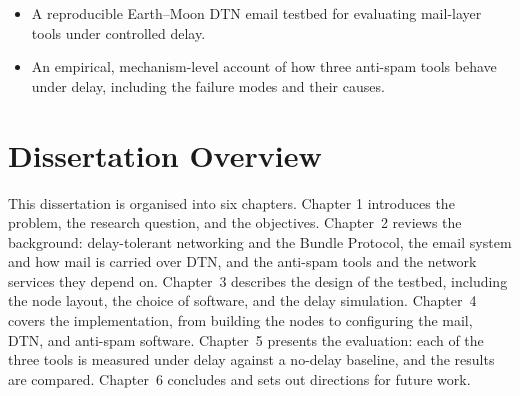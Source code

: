 \begin{itemize}
  \item A reproducible Earth--Moon DTN email testbed for evaluating mail-layer tools
  under controlled delay.
  \item An empirical, mechanism-level account of how three anti-spam tools behave
  under delay, including the failure modes and their causes.
\end{itemize}

\section{Dissertation Overview}

This dissertation is organised into six chapters. Chapter 1 introduces the problem, the research question, and the objectives. Chapter~2 reviews the
background: delay-tolerant networking and the Bundle Protocol, the email system and
how mail is carried over DTN, and the anti-spam tools and the network services they
depend on. Chapter~3 describes the design of the testbed, including the node layout,
the choice of software, and the delay simulation. Chapter~4 covers the
implementation, from building the nodes to configuring the mail, DTN, and anti-spam
software. Chapter~5 presents the evaluation: each of the three tools is measured
under delay against a no-delay baseline, and the results are compared. Chapter~6
concludes and sets out directions for future work.





